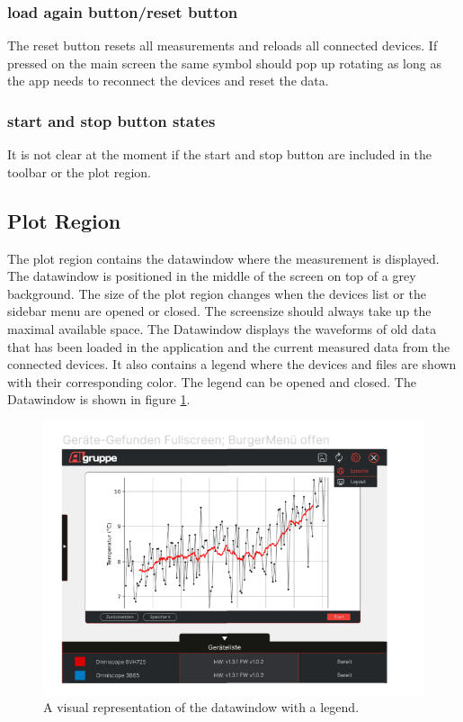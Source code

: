 \documentclass[]{scrreprt}
\begin{document}
\subsubsection{load again button/reset button}

The reset button resets all measurements and reloads all connected devices. If pressed on the main screen the same symbol should pop up rotating as long as the app needs to reconnect the devices and reset the data. 


\subsubsection{start and stop button states}

It is not clear at the moment if the start and stop button are included in the toolbar or the plot region.



\subsection{Plot Region}

The plot region contains the datawindow where the measurement is displayed.
The datawindow is positioned in the middle of the screen on top of a grey background. The size of the plot region changes when the devices list or the sidebar menu are opened or closed. The screensize should always take up the maximal available space. 
The Datawindow displays the waveforms of old data that has been loaded in the application and the current measured data from the connected devices. It also contains a legend where the devices and files are shown with their corresponding color. The legend can be opened and closed. 
The Datawindow is shown in figure \ref{fig: datawindow}.\\
\begin{figure}
    \includegraphics[width=.9\textwidth]{assets/pictures/Mainwindowopen.png}
    \caption[]{A visual representation of the datawindow with a legend.}
    \label{fig: datawindow}
\end{figure}
\end{document}
